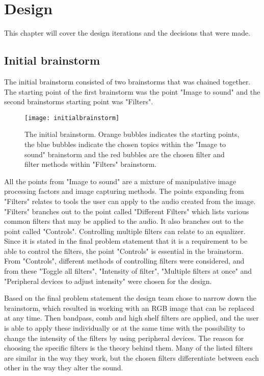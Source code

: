 \chapter{Design}\label{ch:design}
This chapter will cover the design iterations and the decisions that were made. 

\section{Initial brainstorm}
The initial brainstorm consisted of two brainstorms that was chained together. The starting point of the first brainstorm was the point "Image to sound" and the second brainstorms starting point was "Filters". 

\begin{figure}[!h] 
\centering
\texttt{[image: initialbrainstorm]}
\caption{\label{fig:initialbrainstorm} The initial brainstorm. Orange bubbles indicates the starting points, the blue bubbles indicate the chosen topics within the "Image to sound" brainstorm and the red bubbles are the chosen filter and filter methods within "Filters" brainstorm.}
\end{figure}

All the points from "Image to sound" are a mixture of manipulative image processing factors and image capturing methods. 
The points expanding from "Filters" relates to tools the user can apply to the audio created from the image. 
"Filters" branches out to the point called "Different Filters" which lists various common filters that may be applied to the audio. It also branches out to the point called "Controls". Controlling multiple filters can relate to an equalizer. 
Since it is stated in the final problem statement that it is a requirement to be able to control the filters, the point "Controls" is essential in the brainstorm. From "Controls", different methods of controlling filters were considered, and from these "Toggle all filters", "Intensity of filter", "Multiple filters at once" and "Peripheral devices to adjust intensity" were chosen for the design.

Based on the final problem statement the design team chose to narrow down the brainstorm, which resulted in working with an RGB image that can be replaced at any time. Then bandpass, comb and high shelf filters are applied, and the user is able to apply these individually or at the same time with the possibility to change the intensity of the filters by using peripheral devices. 
The reason for choosing the specific filters is the theory behind them. Many of the listed filters are similar in the way they work, but the chosen filters differentiate between each other in the way they alter the sound.


